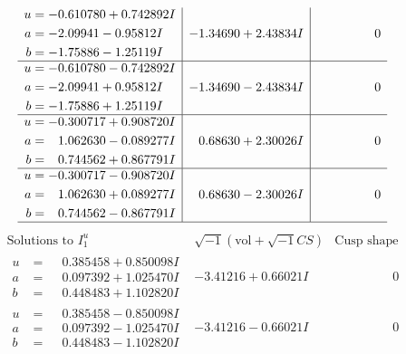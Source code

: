 \documentclass[1p]{elsarticle_modified}
\theoremstyle{definition}
\newcommand{\I}{\sqrt{-1}}
\begin{document}
$$\begin{array}{c|c|c}
\begin{aligned}
u &= -0.610780 + 0.742892 I \\
a &= -2.09941 - 0.95812 I \\
b &= -1.75886 - 1.25119 I\end{aligned}
 & -1.34690 + 2.43834 I & \phantom{-0.000000 } 0 \\ \hline\begin{aligned}
u &= -0.610780 - 0.742892 I \\
a &= -2.09941 + 0.95812 I \\
b &= -1.75886 + 1.25119 I\end{aligned}
 & -1.34690 - 2.43834 I & \phantom{-0.000000 } 0 \\ \hline\begin{aligned}
u &= -0.300717 + 0.908720 I \\
a &= \phantom{-}1.062630 - 0.089277 I \\
b &= \phantom{-}0.744562 + 0.867791 I\end{aligned}
 & \phantom{-}0.68630 + 2.30026 I & \phantom{-0.000000 } 0 \\ \hline\begin{aligned}
u &= -0.300717 - 0.908720 I \\
a &= \phantom{-}1.062630 + 0.089277 I \\
b &= \phantom{-}0.744562 - 0.867791 I\end{aligned}
 & \phantom{-}0.68630 - 2.30026 I & \phantom{-0.000000 } 0\\
 \hline 
 \end{array}$$\newpage$$\begin{array}{c|c|c}  
\text{Solutions to }I^u_{1}& \I (\text{vol} + \sqrt{-1}CS) & \text{Cusp shape}\\
 \hline 
\begin{aligned}
u &= \phantom{-}0.385458 + 0.850098 I \\
a &= \phantom{-}0.097392 + 1.025470 I \\
b &= \phantom{-}0.448483 + 1.102820 I\end{aligned}
 & -3.41216 + 0.66021 I & \phantom{-0.000000 } 0 \\ \hline\begin{aligned}
u &= \phantom{-}0.385458 - 0.850098 I \\
a &= \phantom{-}0.097392 - 1.025470 I \\
b &= \phantom{-}0.448483 - 1.102820 I\end{aligned}
 & -3.41216 - 0.66021 I & \phantom{-0.000000 } 0 \\ \hline\begin{aligned}

\end{aligned}
\end{array}$$
\end{document}

